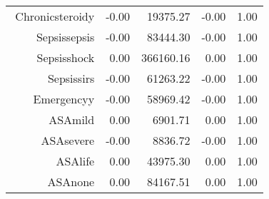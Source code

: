 \begin{tabular}{rrrrr}
$$  Chronic\-steroid\-y & -0.00 & 19375.27 & -0.00 & 1.00 \\ 
  Sepsis\-sepsis & -0.00 & 83444.30 & -0.00 & 1.00 \\ 
  Sepsis\-shock & 0.00 & 366160.16 & 0.00 & 1.00 \\ 
  Sepsis\-sirs & -0.00 & 61263.22 & -0.00 & 1.00 \\ 
  Emergency\-y & -0.00 & 58969.42 & -0.00 & 1.00 \\ 
  ASA\-mild & 0.00 & 6901.71 & 0.00 & 1.00 \\ 
  ASA\-severe & -0.00 & 8836.72 & -0.00 & 1.00 \\ 
  ASA\-life & 0.00 & 43975.30 & 0.00 & 1.00 \\ 
  ASA\-none & 0.00 & 84167.51 & 0.00 & 1.00 \\ 
   \hline
\end{tabular}

